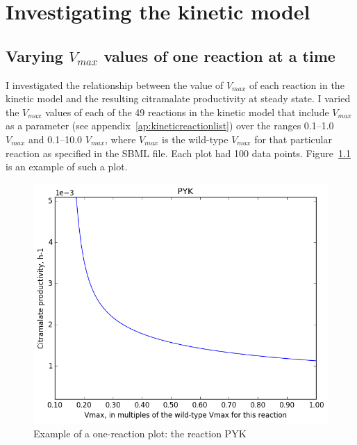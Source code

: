 \documentclass[parskip=full]{scrreprt}
\begin{document}
\chapter{Investigating the kinetic model}
\label{ch:kinetic}


\section{Varying $V_{max}$ values of one reaction at a time}
\label{sec:onereac}

I investigated the relationship between the value of $V_{max}$ of each reaction in the kinetic model and the resulting citramalate productivity at steady state. I varied the $V_{max}$ values of each of the 49 reactions in the kinetic model that include $V_{max}$ as a parameter (see appendix~\ref{ap:kineticreactionlist}) over the ranges 0.1--1.0 $V_{max}$ and 0.1--10.0 $V_{max}$, where $V_{max}$ is the wild-type $V_{max}$ for that particular reaction as specified in the SBML file. Each plot had 100 data points. Figure~\ref{fig:onereacsample} is an example of such a plot.

\begin{figure}[htbp]
  \centering
  \includegraphics[scale=0.5]{onereacsample}
  \caption{Example of a one-reaction plot: the reaction PYK}
  \label{fig:onereacsample}
\end{figure}
\end{document}
